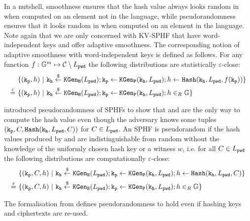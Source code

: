\noindent
In a nutshell, smoothness ensures that the hash value always looks random in \GG when computed on an element not in the language, while pseudorandomness ensures that it looks random in \GG when computed on an element in the language.
Note again that we are only concerned with KV-SPHF that have word-independent keys and offer adaptive smoothness.
The corresponding notion of adaptive smoothness with word-independent keys is defined as follows.
For any function $f:\mathbb{G}^m \mapsto \mathcal{C}\setminus L_\mathtt{pwd}$ the following distributions are statistically $\varepsilon$-close:
\begin{align*}
& \{(\mathtt{k_p},h) ~|~ \mathtt{k_h}\stackrel{\$}{\gets}\mathtt{KGen_H}(L_\mathtt{pwd}); \mathtt{k_p}\gets\mathtt{KGen_P}(\mathtt{k_h},L_\mathtt{pwd}); h\gets\mathtt{Hash}(\mathtt{k_h},L_\mathtt{pwd},f(\mathtt{k_p}))\} \\
\stackrel{\varepsilon}{=}~ & \{(\mathtt{k_p},h) ~|~ \mathtt{k_h}\stackrel{\$}{\gets}\mathtt{KGen_H}(L_\mathtt{pwd}); \mathtt{k_p}\gets\mathtt{KGen_P}(\mathtt{k_h},L_\mathtt{pwd}); h\in_R\mathbb{G}\}
\end{align*}

\noindent
\citet{Gennaro2003} introduced pseudorandomness of \acp{SPHF} to show that \Hash and \PHash are the only way to compute the hash value even though the adversary knows some tuples $(\mathtt{k_p},C,\mathtt{Hash}(\mathtt{k_h},\allowbreak L_\mathtt{pwd},C))$ for $C\in L_\mathtt{pwd}$.
An \ac{SPHF} is pseudorandom if the hash values produced by \Hash and \PHash are indistinguishable from random without the knowledge of the uniformly chosen hash key \hk or a witness $w$, i.e. for all $C\in L_\mathtt{pwd}$ the following distributions are computationally $\varepsilon$-close:
\begin{align*}
& \{(\mathtt{k_p},C,h) ~|~ \mathtt{k_h}\stackrel{\$}{\gets}\mathtt{KGen_H}(L_\mathtt{pwd}); \mathtt{k_p}\gets\mathtt{KGen_P}(\mathtt{k_h},L_\mathtt{pwd}); h\gets\mathtt{Hash}(\mathtt{k_h},L_\mathtt{pwd},C)\} \\
\stackrel{\varepsilon}{=}~ & \{(\mathtt{k_p},C,h) ~|~ \mathtt{k_h}\stackrel{\$}{\gets}\mathtt{KGen_H}(L_\mathtt{pwd}); \mathtt{k_p}\gets\mathtt{KGen_P}(\mathtt{k_h},L_\mathtt{pwd}); h\in_R\mathbb{G}\}
\end{align*}

\noindent
The formalisation from \citet{Katz2011} defines pseudorandomness to hold even if hashing keys and ciphertexts are re-used.

